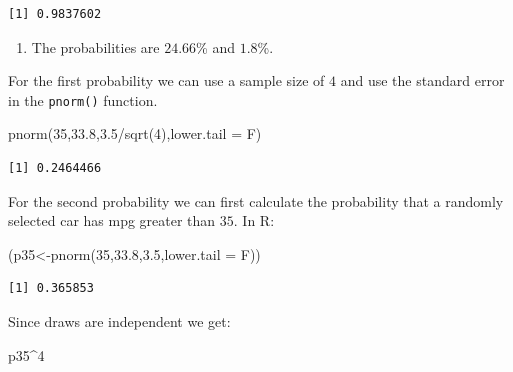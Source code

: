 \documentclass[
  letterpaper,
  DIV=11,
  numbers=noendperiod]{scrreprt}
\newenvironment{Shaded}{\begin{snugshade}}{\end{snugshade}}
\newcommand{\AttributeTok}[1]{\textcolor[rgb]{0.40,0.45,0.13}{#1}}
\newcommand{\DecValTok}[1]{\textcolor[rgb]{0.68,0.00,0.00}{#1}}
\newcommand{\FloatTok}[1]{\textcolor[rgb]{0.68,0.00,0.00}{#1}}
\newcommand{\FunctionTok}[1]{\textcolor[rgb]{0.28,0.35,0.67}{#1}}
\newcommand{\NormalTok}[1]{\textcolor[rgb]{0.00,0.23,0.31}{#1}}
\newcommand{\OtherTok}[1]{\textcolor[rgb]{0.00,0.23,0.31}{#1}}
\newcommand{\SpecialCharTok}[1]{\textcolor[rgb]{0.37,0.37,0.37}{#1}}
\providecommand{\tightlist}{%
  \setlength{\itemsep}{0pt}\setlength{\parskip}{0pt}}\usepackage{longtable,booktabs,array}
\begin{document}
\begin{verbatim}
[1] 0.9837602
\end{verbatim}

\begin{blackbox}

\begin{enumerate}
\def\labelenumi{\arabic{enumi}.}
\setcounter{enumi}{1}
\tightlist
\item
  The probabilities are \(24.66\)\% and \(1.8\)\%.
\end{enumerate}

\end{blackbox}

For the first probability we can use a sample size of \(4\) and use the
standard error in the \texttt{pnorm()} function.

\begin{Shaded}
\begin{Highlighting}[numbers=left,,]
\FunctionTok{pnorm}\NormalTok{(}\DecValTok{35}\NormalTok{,}\FloatTok{33.8}\NormalTok{,}\FloatTok{3.5}\SpecialCharTok{/}\FunctionTok{sqrt}\NormalTok{(}\DecValTok{4}\NormalTok{),}\AttributeTok{lower.tail =}\NormalTok{ F)}
\end{Highlighting}
\end{Shaded}

\begin{verbatim}
[1] 0.2464466
\end{verbatim}

For the second probability we can first calculate the probability that a
randomly selected car has mpg greater than \(35\). In R:

\begin{Shaded}
\begin{Highlighting}[numbers=left,,]
\NormalTok{(p35}\OtherTok{\textless{}{-}}\FunctionTok{pnorm}\NormalTok{(}\DecValTok{35}\NormalTok{,}\FloatTok{33.8}\NormalTok{,}\FloatTok{3.5}\NormalTok{,}\AttributeTok{lower.tail =}\NormalTok{ F))}
\end{Highlighting}
\end{Shaded}

\begin{verbatim}
[1] 0.365853
\end{verbatim}

Since draws are independent we get:

\begin{Shaded}
\begin{Highlighting}[numbers=left,,]
\NormalTok{p35}\SpecialCharTok{\^{}}\DecValTok{4}
\end{Highlighting}
\end{Shaded}
\end{document}
